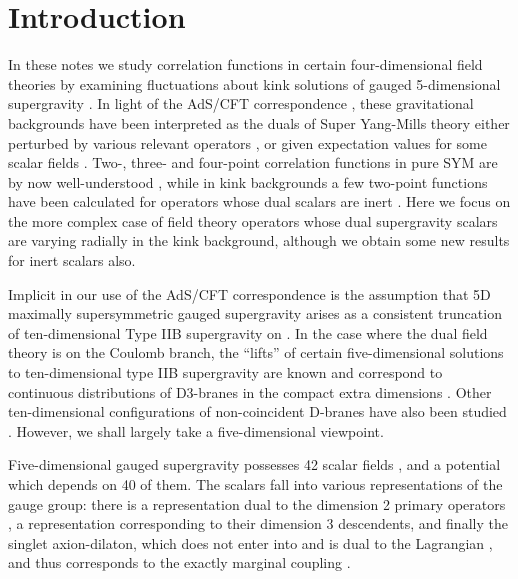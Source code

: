 \documentclass[a4paper,12pt]{article}
\def\Tr{\rm Tr\ }
\begin{document}
\newpage
\section{Introduction}

In these notes we study correlation functions in certain
four-dimensional field theories by examining fluctuations about kink
solutions of gauged 5-dimensional \coordHE{} supergravity
\cite{GRW,PPvN}. In light of the AdS/CFT correspondence
\cite{juan,gkp,witten1}, these gravitational backgrounds have been
interpreted as the duals of \coordHE{} Super Yang-Mills theory
either perturbed by various relevant operators \cite{gppz1, dz1,
fgpw1, gppz, dz2}, or given expectation values for some scalar fields
\cite{fgpw2}.  Two-, three- and four-point correlation functions
in pure \coordHE{} SYM are by now well-understood \cite{gkp,
witten1, fmmr, dmmr}, while in kink backgrounds a few two-point
functions have been calculated for operators whose dual scalars are
inert \cite{fgpw2}.  Here we focus on the more complex case of field
theory operators whose dual supergravity scalars are varying radially
in the kink background, although we obtain some new results for inert
scalars also.

Implicit in our use of the AdS/CFT correspondence is the assumption
that 5D maximally supersymmetric gauged supergravity arises as a
consistent truncation of ten-dimensional Type IIB supergravity on
\coordHE{}.  In the case where the dual field theory is on the
Coulomb branch, the ``lifts'' of certain five-dimensional solutions to
ten-dimensional type IIB supergravity are known and correspond to
continuous distributions of D3-branes in the compact extra dimensions
\cite{fgpw2,bs}.  Other ten-dimensional configurations of non-coincident
D-branes have also been studied \cite{kw, cr, rv}. However, we shall
largely take a five-dimensional viewpoint.


Five-dimensional \coordHE{} gauged supergravity possesses 42 scalar
fields \coordHE{}, and a potential \coordHE{} which depends on
40 of them.  The scalars fall into various representations of the
\coordHE{} gauge group: there is a \coordHE{} representation dual to the
dimension 2 primary operators \myHighlight{${\Tr} X^2$}\coordHE{}, a \coordHE{}
representation corresponding to their dimension 3 descendents, and
finally the singlet axion-dilaton, which does not enter into
\coordHE{} and is dual to the \coordHE{} Lagrangian \myHighlight{${\cal L} =
{\Tr} F^2 + \cdots$}\coordHE{}, and thus corresponds to the exactly marginal
coupling \coordHE{}.
\end{document}
